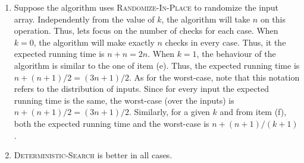 \begin{enumerate}
\begin{framed}
\begin{enumerate}
\item Suppose the algorithm uses \textsc{Randomize-In-Place} to randomize the
input array. Independently from the value of $k$, the algorithm will take
$n$ on this operation. Thus, lets focus on the number of checks for each
case. When $k = 0$, the algorithm will make exactly $n$ checks in every case.
Thus, it the expected running time is $n + n = 2n$. When $k = 1$, the
behaviour of the algorithm is similar to the one of item (e). Thus, the expected
running time is $n + (n + 1)/2 = (3n + 1)/2$. As for the worst-case, note that
this notation refers to the distribution of inputs.  Since for every input the
expected running time is the same, the worst-case (over the inputs) is
$n + (n + 1)/2 = (3n + 1)/2$. Similarly, for a given $k$ and from item (f),
both the expected running time and the worst-case is $n + (n + 1)/(k + 1)$.

\item \textsc{Deterministic-Search} is better in all cases.
\end{enumerate}
\end{framed}

\end{enumerate}
